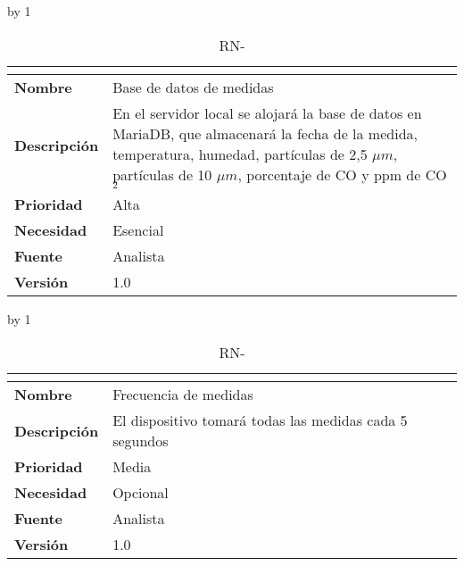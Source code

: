 \advance\rn by 1
\begin{table}[H]
	\caption{RN-\number\rn}
	\begin{tabular}{|l|p{}|}
		\hline
		\multicolumn{2}{|c|}{\cellcolor[HTML]{BFBFBF}{\color[HTML]{000000} \textbf{RN-\number\rn}}} \\ \hline
		\textbf{Nombre}      & Base de datos de medidas                                                                                                                                                                                       \\ \hline
		\textbf{Descripción} & En el servidor local se alojará la base de datos en MariaDB, que almacenará la fecha de la medida, temperatura, humedad, partículas de 2,5 $\mu m$, partículas de 10 $\mu m$, porcentaje de CO y ppm de CO$_2$ \\ \hline
		\textbf{Prioridad}   & Alta                                                                                                                                                                                                           \\ \hline
		\textbf{Necesidad}   & Esencial                                                                                                                                                                                                       \\ \hline
		\textbf{Fuente}      & Analista                                                                                                                                                                                                       \\ \hline
		\textbf{Versión}     & 1.0                                                                                                                                                                                                            \\ \hline
	\end{tabular}
\end{table}
\advance\rn by 1
\begin{table}[H]
	\caption{RN-\number\rn}
	\begin{tabular}{|l|p{}|}
		\hline
		\multicolumn{2}{|c|}{\cellcolor[HTML]{BFBFBF}{\color[HTML]{000000} \textbf{RN-\number\rn}}} \\ \hline
		\textbf{Nombre}      & Frecuencia de medidas                                   \\ \hline
		\textbf{Descripción} & El dispositivo tomará todas las medidas cada 5 segundos \\ \hline
		\textbf{Prioridad}   & Media                                                   \\ \hline
		\textbf{Necesidad}   & Opcional                                                \\ \hline
		\textbf{Fuente}      & Analista                                                \\ \hline
		\textbf{Versión}     & 1.0                                                     \\ \hline
	\end{tabular}
\end{table}
